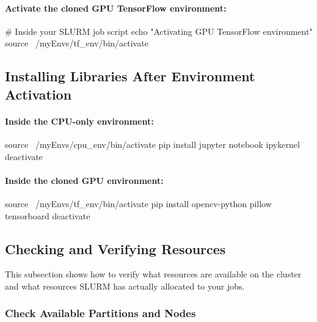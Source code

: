 \documentclass[11pt]{article}
\begin{document}
\paragraph{Activate the cloned GPU TensorFlow environment:\\}
\begin{codeblock}
# Inside your SLURM job script
echo "Activating GPU TensorFlow environment"
source ~/myEnvs/tf_env/bin/activate
\end{codeblock}

\subsection{Installing Libraries After Environment Activation}
\label{subsec:install-libs-example}

\paragraph{Inside the CPU-only environment:\\}
\begin{codeblock}
source ~/myEnvs/cpu_env/bin/activate
pip install jupyter notebook ipykernel
deactivate
\end{codeblock}

\paragraph{Inside the cloned GPU environment:\\}
\begin{codeblock}
source ~/myEnvs/tf_env/bin/activate
pip install opencv-python pillow tensorboard
deactivate
\end{codeblock}


\subsection{Checking and Verifying Resources}
\label{subsec:check-resources}

This subsection shows how to verify what resources are available on the cluster
and what resources SLURM has actually allocated to your jobs.

\subsubsection{Check Available Partitions and Nodes}
\end{document}
